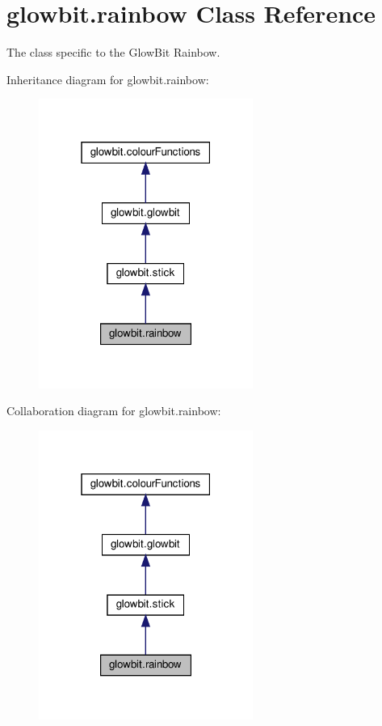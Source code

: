 \hypertarget{classglowbit_1_1rainbow}{}\section{glowbit.\+rainbow Class Reference}
\label{classglowbit_1_1rainbow}


The class specific to the Glow\+Bit Rainbow.  




Inheritance diagram for glowbit.\+rainbow\+:\nopagebreak
\begin{figure}[H]
\begin{center}
\leavevmode
\includegraphics[width=199pt]{classglowbit_1_1rainbow__inherit__graph}
\end{center}
\end{figure}


Collaboration diagram for glowbit.\+rainbow\+:\nopagebreak
\begin{figure}[H]
\begin{center}
\leavevmode
\includegraphics[width=199pt]{classglowbit_1_1rainbow__coll__graph}
\end{center}
\end{figure}

